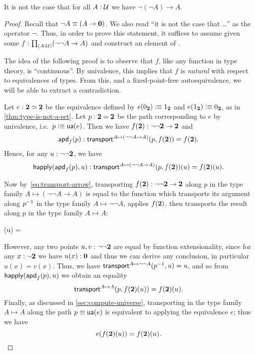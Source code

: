 \begin{thm}\label{thm:not-dneg}
  It is not the case that for all $A:\mathcal{U}$ we have $\neg(\neg A) \to A$.
\end{thm}
\begin{proof}
  Recall that $\neg A \equiv (A\to\mathbf{0})$.
  We also read ``it is not the case that \dots'' as the operator $\neg$.
  Thus, in order to prove this statement, it suffices to assume given some $f:\prd{A:\UU} (\neg\neg A \to A)$ and construct an element of \emptyt.

  The idea of the following proof is to observe that $f$, like any function in type theory, is ``continuous''.
  By univalence, this implies that $f$ is \emph{natural} with respect to equivalences of types.
  From this, and a fixed-point-free autoequivalence, we will be able to extract a contradiction.

  Let $e:\mathbf{2} \simeq \mathbf{2}$ be the equivalence defined by $e({0_{\mathbf{2}}})\vcentcolon\equiv{1_{\ensuremath{\mathbf{2}}}}$ and $e({1_{\mathbf{2}}})\vcentcolon\equiv{0_{\ensuremath{\mathbf{2}}}}$, as in \autoref{thm:type-is-not-a-set}.
  Let $p:\mathbf{2}=\mathbf{2}$ be the path corresponding to $e$ by univalence, i.e.\ $p\vcentcolon\equiv \mathsf{ua}(e)$.
  Then we have $f(\mathbf{2}) : \neg\neg\mathbf{2} \to\mathbf{2}$ and
  \[\mathsf{apd}_{f}\mathopen{}\left(p\right)\mathclose{} : \mathsf{transport}^{A\mapsto (\neg\neg A \to A)}(p,f(\mathbf{2})) = f(\mathbf{2}).\]
  Hence, for any $u:\neg\neg\mathbf{2}$, we have
  \[\mathsf{happly}(\mathsf{apd}_{f}\mathopen{}\left(p\right)\mathclose{},u) : \mathsf{transport}^{A\mapsto (\neg\neg A \to A)}(p,f(\mathbf{2}))(u) = f(\mathbf{2})(u).\]

  Now by~\eqref{eq:transport-arrow}, transporting $f(\mathbf{2}):\neg\neg\mathbf{2}\to\mathbf{2}$ along $p$ in the type family ${A\mapsto (\neg\neg A \to A)}$ is equal to the function which transports its argument along $\mathord{{p}^{-1}}$ in the type family $A\mapsto \neg\neg A$, applies $f(\mathbf{2})$, then transports the result along $p$ in the type family $A\mapsto A$:
  \begin{narrowmultline*}
    (u) =
    \narrowbreak
  \end{narrowmultline*}
  However, any two points $u,v:\neg\neg\mathbf{2}$ are equal by function extensionality, since for any $x:\neg\mathbf{2}$ we have $u(x):\mathbf{0}$ and thus we can derive any conclusion, in particular $u(x)=v(x)$.
  Thus, we have $\mathsf{transport}^{A\mapsto \neg\neg A}(\mathord{{p}^{-1}},u) = u$, and so from $\mathsf{happly}(\mathsf{apd}_{f}\mathopen{}\left(p\right)\mathclose{},u)$ we obtain an equality
  \[ \mathsf{transport}^{A\mapsto A}(p,f(\mathbf{2})(u)) = f(\mathbf{2})(u).\]
  Finally, as discussed in \autoref{sec:compute-universe}, transporting in the type family $A\mapsto A$ along the path $p\equiv \mathsf{ua}(e)$ is equivalent to applying the equivalence $e$; thus we have
  \begin{equation}
    e(f(\bool)(u)) = f(\bool)(u).\label{eq:fpaut}
  \end{equation}


\end{proof}
